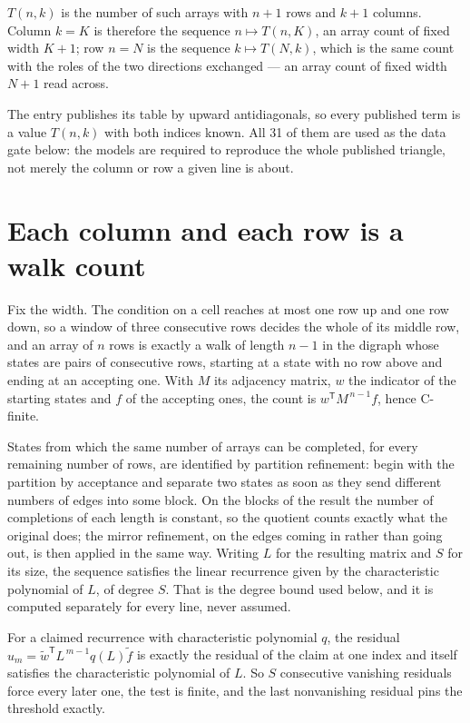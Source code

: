 \documentclass[11pt]{article}
\theoremstyle{definition}
\begin{document}
$T(n,k)$ is the number of such arrays with $n + 1$ rows and $k + 1$ columns. Column $k = K$ is therefore the sequence $n \mapsto T(n,K)$, an array count of fixed width $K + 1$; row $n = N$ is the sequence $k \mapsto T(N,k)$, which is the same count with the roles of the two directions exchanged --- an array count of fixed width $N + 1$ read across.

The entry publishes its table by upward antidiagonals, so every published term is a value $T(n,k)$ with both indices known. All 31 of them are used as the data gate below: the models are required to reproduce the whole published triangle, not merely the column or row a given line is about.

\section{Each column and each row is a walk count}

Fix the width. The condition on a cell reaches at most one row up and one row down, so a window of three consecutive rows decides the whole of its middle row, and an array of $n$ rows is exactly a walk of length $n-1$ in the digraph whose states are pairs of consecutive rows, starting at a state with no row above and ending at an accepting one. With $M$ its adjacency matrix, $w$ the indicator of the starting states and $f$ of the accepting ones, the count is $w^{\mathsf T}M^{\,n-1}f$, hence C-finite.

States from which the same number of arrays can be completed, for every remaining number of rows, are identified by partition refinement: begin with the partition by acceptance and separate two states as soon as they send different numbers of edges into some block. On the blocks of the result the number of completions of each length is constant, so the quotient counts exactly what the original does; the mirror refinement, on the edges coming in rather than going out, is then applied in the same way. Writing $L$ for the resulting matrix and $S$ for its size, the sequence satisfies the linear recurrence given by the characteristic polynomial of $L$, of degree $S$. That is the degree bound used below, and it is computed separately for every line, never assumed.

For a claimed recurrence with characteristic polynomial $q$, the residual $u_m = \tilde w^{\mathsf T}L^{\,m-1}q(L)\tilde f$ is exactly the residual of the claim at one index and itself satisfies the characteristic polynomial of $L$. So $S$ consecutive vanishing residuals force every later one, the test is finite, and the last nonvanishing residual pins the threshold exactly.
\end{document}
